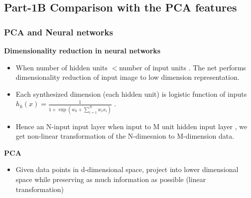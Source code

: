 \documentclass[12pt,t]{beamer}
\begin{document}
\begin{frame}
\begin{columns}
    \end{columns}
\end{frame}


\subsection{Part-1B Comparison with the PCA features}

\begin{frame}
    \frametitle{PCA and Neural networks}
    \textbf{Dimensionality reduction in neural networks}
    \begin{itemize}
        \item When number of hidden units $< $number of input units . The net performs dimensionality 
                reduction of input image to low dimension representation.
        \item Each synthesized dimension (each hidden unit) is logistic
        function of inputs $h_k(x) = \frac{1}{ 1+ \exp (w_0+\sum_{i=1}^{N}{w_i x_i}) }$ .
        \item Hence an N-input input layer when input to M unit hidden input layer , we get 
            non-linear transformation of the N-dimesnion to M-dimension data.
    

    \end{itemize}
    \textbf{PCA}
    \begin{itemize}
        \item Given data points in d-dimensional space, project into lower
        dimensional space while preserving as much information as
        possible (linear transformation)
    \end{itemize}
    

\end{frame}
\end{document}
